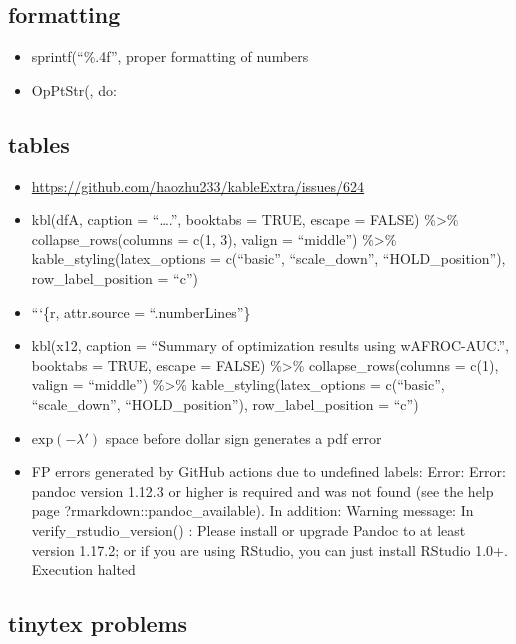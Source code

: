 \documentclass[
]{book}
\providecommand{\tightlist}{%
  \setlength{\itemsep}{0pt}\setlength{\parskip}{0pt}}
\begin{document}
\hypertarget{formatting}{%
\subsection{formatting}\label{formatting}}

\begin{itemize}
\tightlist
\item
  sprintf(``\%.4f'', proper formatting of numbers
\item
  OpPtStr(, do:
\end{itemize}

\hypertarget{tables}{%
\subsection{tables}\label{tables}}

\begin{itemize}
\tightlist
\item
  \url{https://github.com/haozhu233/kableExtra/issues/624}
\item
  kbl(dfA, caption = ``\ldots.'', booktabs = TRUE, escape = FALSE) \%\textgreater\% collapse\_rows(columns = c(1, 3), valign = ``middle'') \%\textgreater\% kable\_styling(latex\_options = c(``basic'', ``scale\_down'', ``HOLD\_position''), row\_label\_position = ``c'')
\item
  ```\{r, attr.source = ``.numberLines''\}
\item
  kbl(x12, caption = ``Summary of optimization results using wAFROC-AUC.'', booktabs = TRUE, escape = FALSE) \%\textgreater\% collapse\_rows(columns = c(1), valign = ``middle'') \%\textgreater\% kable\_styling(latex\_options = c(``basic'', ``scale\_down'', ``HOLD\_position''), row\_label\_position = ``c'')
\item
  \(\text{exp} \left ( -\lambda' \right )\) space before dollar sign generates a pdf error
\item
  FP errors generated by GitHub actions due to undefined labels:
  Error: Error: pandoc version 1.12.3 or higher is required and was not found (see the help page ?rmarkdown::pandoc\_available).
  In addition: Warning message:
  In verify\_rstudio\_version() :
  Please install or upgrade Pandoc to at least version 1.17.2; or if you are using RStudio, you can just install RStudio 1.0+.
  Execution halted
\end{itemize}

\hypertarget{tinytex-problems}{%
\subsection{tinytex problems}\label{tinytex-problems}}
\end{document}
